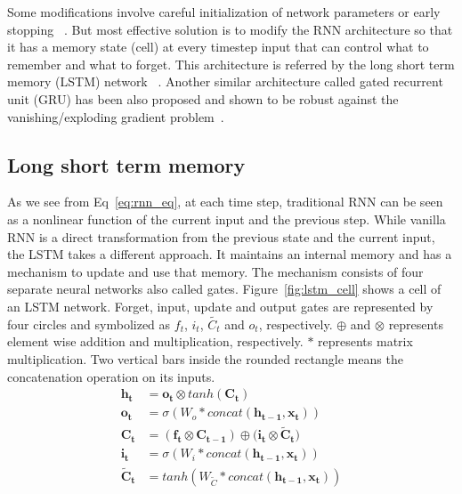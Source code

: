 \documentclass[10pt,twocolumn,letterpaper]{article}
\begin{document}
Some modifications involve 
careful initialization of network parameters or  early stopping  ~\cite{DBLP:journals/corr/abs-1211-5063}. But most effective solution is 
to modify the RNN architecture so that it has a memory state (cell) at every timestep input  that can control what to remember and what to forget. This architecture is referred by the 
long short term memory (LSTM) network ~\cite{Hochreiter:1997:LSM:1246443.1246450}. Another similar architecture called gated recurrent unit (GRU) has been also proposed and shown to be robust
against the 
vanishing/exploding gradient problem~\cite{DBLP:journals/corr/ChoMGBSB14}.

\subsection{Long short term memory} \label{lstm_sec}
As we see from Eq~\ref{eq:rnn_eq}, at each time step, traditional RNN can be 
seen as a nonlinear function of the current input and the previous step. While vanilla RNN is a 
direct transformation from the previous state and the current input, the 
LSTM takes a different approach. It maintains an internal memory and  has a 
mechanism to update and use that memory. The mechanism consists of four separate neural networks also 
called gates. Figure~\ref{fig:lstm_cell} shows a cell of an LSTM network.
Forget, input, update and output gates are represented by four circles and symbolized as $f_t$, $i_t$, $\tilde{C_t}$ and $o_t$, respectively. $\oplus$ and $\otimes$ represents element wise addition and multiplication, 
respectively. $*$ represents matrix multiplication. Two vertical bars inside the rounded rectangle means the 
concatenation operation on its inputs. 
\begin{equation}
\label{eq:lstm_eq}
	\begin{aligned}
		\mathbf{h_t} &= \mathbf{o_t} \otimes tanh(\mathbf{C_t}) \\
		\mathbf{o_t} &= \sigma(W_o * concat(\mathbf{h_{t-1}}, \mathbf{x_t})) \\
		\mathbf{C_t} &= (\mathbf{f_t} \otimes \mathbf{C_{t-1}}) \oplus (\mathbf{i_t} \otimes \mathbf{\tilde{C}_t)}  \\
		\mathbf{i_t} &= \sigma(W_i * concat(\mathbf{h_{t-1}}, \mathbf{x_t})) \\
		\mathbf{\tilde{C}_t} &= tanh(W_{\tilde{C}} * concat(\mathbf{h_{t-1}}, \mathbf{x_t}))
	\end{aligned}
\end{equation}
\end{document}
